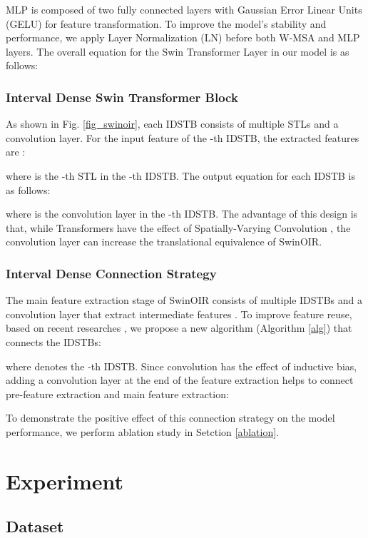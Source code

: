 \documentclass[default,iicol]{sn-jnl}
\theoremstyle{thmstyleone}\newtheorem{theorem}{Theorem}\newtheorem{proposition}[theorem]{Proposition}
\theoremstyle{thmstyletwo}\newtheorem{example}{Example}\newtheorem{remark}{Remark}\theoremstyle{thmstylethree}\newtheorem{definition}{Definition}
\begin{document}
MLP is composed of two fully connected layers with Gaussian Error Linear Units (GELU) \cite{hendrycks2016gaussian} for feature transformation. To improve the model's stability and performance, we apply Layer Normalization (LN) \cite{ba2016layer} before both W-MSA and MLP layers. The overall equation for the Swin Transformer Layer in our model is as follows:


\subsubsection{Interval Dense Swin Transformer Block}
As shown in Fig. \ref{fig_swinoir}, each IDSTB consists of multiple STLs and a convolution layer. For the input feature  of the -th IDSTB, the extracted features are :


where  is the -th STL in the -th IDSTB. The output equation for each IDSTB is as follows:


where  is the convolution layer in the -th IDSTB. The advantage of this design is that, while Transformers have the effect of Spatially-Varying Convolution \cite{vaswani2021scaling}\cite{elsayed2020revisiting}, the convolution layer can increase the translational equivalence of SwinOIR.

\subsubsection{Interval Dense Connection Strategy}
The main feature extraction stage of SwinOIR consists of multiple IDSTBs and a convolution layer that extract intermediate features . To improve feature reuse, based on recent researches \cite{ju2022threshnet}\cite{ju2023efficient}, we propose a new algorithm (Algorithm \ref{alg}) that connects the IDSTBs:


where  denotes the -th IDSTB. Since convolution has the effect of inductive bias, adding a convolution layer  at the end of the feature extraction helps to connect pre-feature extraction and main feature extraction:

 

To demonstrate the positive effect of this connection strategy on the model performance, we perform ablation study in Setction \ref{ablation}. 

\section{Experiment}
\label{experiment}
\subsection{Dataset}
\end{document}
